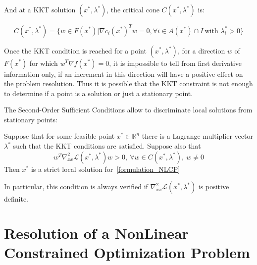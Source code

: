 And at a KKT solution $(x^*,\lambda^*)$, the critical cone $C(x^*, \lambda^*)$ is:

\begin{equation}
  C(x^*,\lambda^*) = \{w\in F(x^*)|{\nabla c_i(x^*)}^T w=0, \forall i\in\mathit{A}(x^*)\cap I\ \text{with } \lambda_i^*>0\}
\end{equation}


Once the KKT condition is reached for a point $(x^*, \lambda^*)$, for a direction $w$ of $F(x^*)$ for which $w^T\nabla f(x^*)=0$, it is impossible to tell from first derivative information only, if an increment in this direction will have a positive effect on the problem resolution.
Thus it is possible that the KKT constraint is not enough to determine if a point is a solution or just a stationary point.

The Second-Order Sufficient Conditions allow to discriminate local solutions from stationary points:

\begin{theorem}
  Suppose that for some feasible point $x^*\in \mathbb{R}^n$ there is a Lagrange multiplier vector $\lambda^*$ such that the KKT conditions are satisfied. Suppose also that
  \begin{equation}
    w^T\nabla_{xx}^2\mathcal{L}(x^*,\lambda^*)w>0,\ \forall w\in C(x^*,\lambda^*),\ w\neq 0
  \end{equation}
  Then $x^*$ is a strict local solution for~\ref{formulation_NLCP}
\end{theorem}

In particular, this condition is always verified if $\nabla_{xx}^2\mathcal{L}(x^*,\lambda^*)$ is positive definite.

\section{Resolution of a NonLinear Constrained Optimization Problem}
\label{sec:resolution_of_a_non_linear_constrained_optimization_problem}

